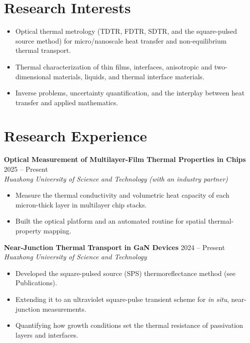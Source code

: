 \documentclass[10pt,a4paper]{article}
\begin{document}
\section{Research Interests}
\begin{itemize}
  \item Optical thermal metrology (TDTR, FDTR, SDTR, and the square-pulsed source method) for micro/nanoscale heat transfer and non-equilibrium thermal transport.
  \item Thermal characterization of thin films, interfaces, anisotropic and two-dimensional materials, liquids, and thermal interface materials.
  \item Inverse problems, uncertainty quantification, and the interplay between heat transfer and applied mathematics.
\end{itemize}

\section{Research Experience}

\textbf{Optical Measurement of Multilayer-Film Thermal Properties in Chips} \hfill 2025 -- Present\\
\textit{Huazhong University of Science and Technology (with an industry partner)}
\begin{itemize}
  \item Measure the thermal conductivity and volumetric heat capacity of each micron-thick layer in multilayer chip stacks.
  \item Built the optical platform and an automated routine for spatial thermal-property mapping.
\end{itemize}

\vspace{2pt}
\textbf{Near-Junction Thermal Transport in GaN Devices} \hfill 2024 -- Present\\
\textit{Huazhong University of Science and Technology}
\begin{itemize}
  \item Developed the square-pulsed source (SPS) thermoreflectance method (see Publications).
  \item Extending it to an ultraviolet square-pulse transient scheme for \emph{in situ}, near-junction measurements.
  \item Quantifying how growth conditions set the thermal resistance of passivation layers and interfaces.
\end{itemize}
\end{document}
